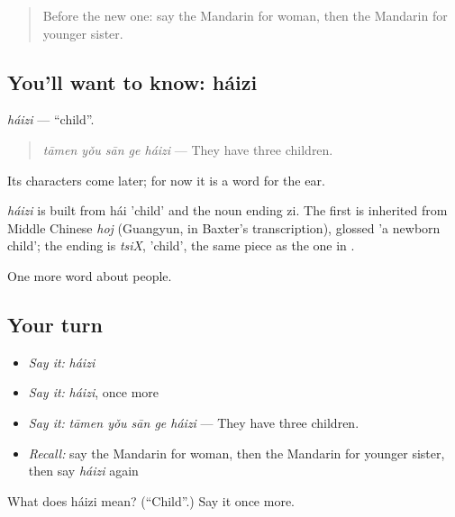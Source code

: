 \label{lesson:ZH-C33-haizi}



\begin{quote}
Before the new one: say the Mandarin for woman, then the Mandarin for younger sister.
\end{quote}

\subsection*{You'll want to know: háizi}
\emph{háizi} — \textquotedblleft{}child\textquotedblright{}.

\begin{quote}
\emph{tāmen yǒu sān ge háizi} — They have three children.
\end{quote}

Its characters come later; for now it is a word for the ear.

\begin{cousinweb}
\emph{háizi} is built from hái 'child' and the noun ending zi. The first is inherited from Middle Chinese \emph{hoj} (Guangyun, in Baxter's transcription), glossed 'a newborn child'; the ending is \emph{tsiX}, 'child', the same piece as the one in .
\end{cousinweb}

\begin{grammarlens}[title={What you've built}]
One more word about people.
\end{grammarlens}

\subsection*{Your turn}
\begin{itemize}
\raggedright
  \item \emph{Say it:} \emph{háizi}
  \item \emph{Say it:} \emph{háizi}, once more
  \item \emph{Say it:} \emph{tāmen yǒu sān ge háizi} — They have three children.
  \item \emph{Recall:} say the Mandarin for woman, then the Mandarin for younger sister, then say \emph{háizi} again
\end{itemize}

\begin{tcolorbox}[breakable,colback=teal!4,colframe=teal!35!black,title={Before you move on}]
What does háizi mean? (\textquotedblleft{}Child\textquotedblright{}.) Say it once more.
\end{tcolorbox}
